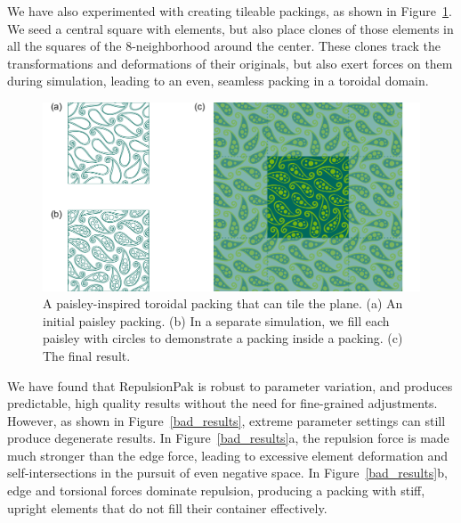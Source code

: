 We have also experimented with creating tileable packings, as shown
in Figure~\ref{paisley_packing}.  We seed a central square with elements,
but also place clones of those elements in all the squares of the
8-neighborhood around the center.  These clones track the transformations
and deformations of their originals, but also exert forces on them during
simulation, leading to an even, seamless packing in a toroidal domain.

\begin{figure}
\centering
\includegraphics[width=1.0\textwidth]{figures/repulsionpak/paisley_new.pdf} 
\vspace{-10pt}
\caption[A paisley-inspired toroidal packing]
{\label{paisley_packing}
A paisley-inspired toroidal packing that can tile the plane. 
           (a) An initial paisley packing.
           (b) In a separate simulation, we fill each paisley with circles to demonstrate a packing inside a packing.
           (c) The final result.
}
\end{figure}






We have found that RepulsionPak is robust to parameter variation, and 
produces predictable, high quality results without the need for fine-grained
adjustments.  However, as shown in Figure~\ref{bad_results}, extreme parameter 
settings can still produce degenerate results.
In Figure~\ref{bad_results}a, the repulsion force is made much stronger than 
the edge force, leading to excessive element deformation and
self-intersections in the pursuit of even negative space.  In 
Figure~\ref{bad_results}b, edge and torsional forces dominate repulsion,
producing a packing with stiff, upright elements that do not fill their
container effectively.


